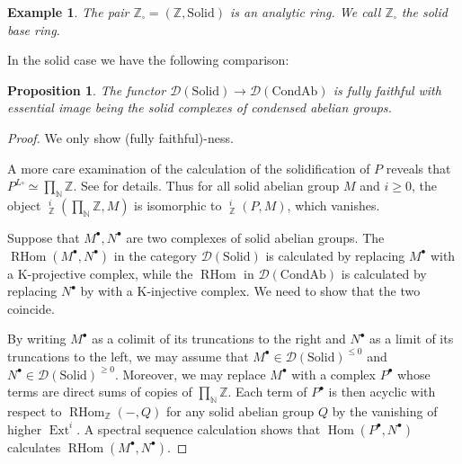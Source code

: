 \documentclass{article}
\theoremstyle{plain}
\newtheorem{prop}[thm]{Proposition}
\newtheorem{exmp}[thm]{Example}
\theoremstyle{definition}
\theoremstyle{remark}
\DeclareMathOperator{\Hom}{Hom}
\DeclareMathOperator{\rhom}{RHom}
\DeclareMathOperator{\ext}{Ext}
\DeclareMathOperator{\exts}{\underline{Ext}}
\newcommand{\D}{\mathcal{D}}
\newcommand{\solid}{\square}
\begin{document}
\begin{exmp}
The pair $ \mathbb{Z}_{\solid} = (\mathbb{Z}, \mathrm{Solid}) $ is an analytic ring.
We call $ \mathbb{Z}_{\solid} $ the solid base ring.
\end{exmp}

In the solid case we have the following comparison:
\begin{prop}
The functor $ \D (\mathrm{Solid})\to \D (\mathrm{CondAb}) $ is fully faithful with essential image being
the solid complexes of condensed abelian groups.
\end{prop}

\begin{proof}
We only show (fully faithful)-ness.

A more care examination of the calculation of the solidification of $ P $ reveals that
$ P ^{L\solid}\simeq \prod _{\mathbb{N}}\mathbb{Z} $.
See \cite[\href{https://www.youtube.com/watch?v=bdQ-\_CZ5tl8\&list=PLx5f8IelFRgGmu6gmL-Kf\_Rl\_6Mm7juZO\&index=5\&t=3182s}{Video 5, 53:02}]{ihesvid}
for details.
Thus for all solid abelian group $ M $ and $ i\geq 0 $, the object
$ \exts ^{i}_{\mathbb{Z}}(\prod _{\mathbb{N}} \mathbb{Z}, M) $
is isomorphic to $ \exts ^{i}_{\mathbb{Z}}(P, M) $, which vanishes.

Suppose that $ M ^{\bullet}, N ^{\bullet} $ are two complexes of solid abelian groups.
The $ \rhom (M ^{\bullet}, N ^{\bullet}) $ in the category $ \D (\mathrm{Solid}) $ is calculated by replacing $ M ^{\bullet} $
with a K-projective complex,
while the $ \rhom $ in $ \D (\mathrm{CondAb}) $ is calculated by replacing $ N ^{\bullet} $ by with a K-injective complex.
We need to show that the two coincide.

By writing $ M ^{\bullet} $ as a colimit of its truncations to the right and $ N ^{\bullet} $ as a limit of its truncations to the left,
we may assume that $ M ^{\bullet}\in \D (\mathrm{Solid})^{\leq 0} $ and $ N ^{\bullet}\in \D (\mathrm{Solid})^{\geq 0} $.
Moreover, we may replace $ M ^{\bullet} $ with a complex $ P ^{\bullet} $ whose terms are direct sums of copies of $ \prod _{\mathbb{N}} \mathbb{Z} $.
Each term of $ P ^{\bullet} $ is then acyclic with respect to $ \rhom _{\mathbb{Z}}(-, Q) $
for any solid abelian group $ Q $ by the vanishing of higher $ \ext ^{i} $.
A spectral sequence calculation shows that $ \Hom (P ^{\bullet}, N ^{\bullet}) $ calculates $ \rhom (M ^{\bullet}, N ^{\bullet}) $.
\end{proof}
\end{document}
